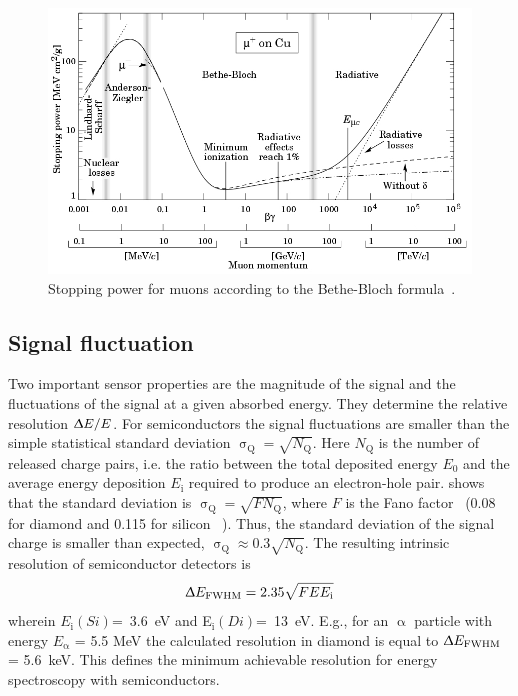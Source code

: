 \begin{figure}[!t]
\begin{center}
\includegraphics[width=0.7\linewidth]{02_pulse_formation/pics/bb2}
\caption{Stopping power for muons according to the Bethe-Bloch formula~\cite{BETHE:00001}.}
\label{fig:bb2}
\end{center}
\end{figure}

\subsection{Signal fluctuation}
Two important sensor properties are the magnitude of the signal and the fluctuations of the signal at a given absorbed energy. They determine the relative resolution $\Updelta E/E$. For semiconductors the signal fluctuations are smaller than the simple statistical standard deviation $\upsigma_\mathrm{Q}=\sqrt{N_\mathrm{Q}}$. Here $N_\mathrm{Q}$ is the number of released charge pairs, i.e. the ratio between the total deposited energy $E_\mathrm{0}$ and the average energy deposition $E_\mathrm{i}$ required to produce an electron-hole pair. \cite{1947PhRv...72...26F} shows that the standard deviation is $\upsigma_\mathrm{Q}=\sqrt{F N_\mathrm{Q}}$, where $F$ is the Fano factor~\cite{1947PhRv...72...26F} (0.08 for diamond and 0.115 for silicon ~\cite{1980PhRvB..22.5565A}). Thus, the standard deviation of the signal charge is smaller than expected, $\upsigma_\mathrm{Q}\approx0.3 \sqrt{N_\mathrm{Q}}$. The resulting intrinsic resolution of semiconductor detectors is 
\begin{equation}
\label{eq:efwhm}
\Updelta E_\mathrm{FWHM} = 2.35 \sqrt{FEE_\mathrm{i}} 
\end{equation} 
wherein $E_\mathrm{i}(Si)$=~3.6~eV and E$_\mathrm{i}(Di)$=~13~eV. E.g., for an $\upalpha$ particle with energy $E_\upalpha$ = 5.5 MeV the calculated resolution in diamond is equal to $\Updelta E_{\mathrm{FWHM}}$ = 5.6~keV. This defines the minimum achievable resolution for energy spectroscopy with semiconductors. 
%



